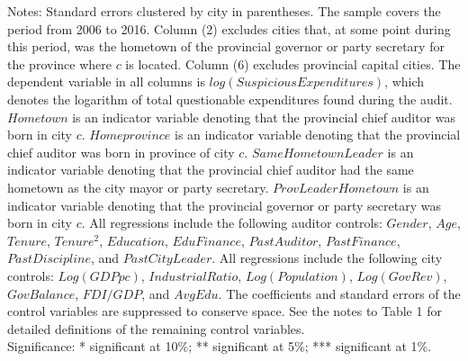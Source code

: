 \begin{table}[p]
\begin{threeparttable}
\begin{tablenotes}
\item Notes: Standard errors clustered by city in parentheses. The sample covers the period from 2006 to 2016. Column (2) excludes cities that, at some point during this period, was the hometown of the provincial governor or party secretary for the province where $ c $ is located. Column (6) excludes provincial capital cities. The dependent variable in all columns is $ log(SuspiciousExpenditures) $, which denotes the logarithm of total questionable expenditures found during the audit. $ Hometown $ is an indicator variable denoting that the provincial chief auditor was born in city $ c $. $ Homeprovince $ is an indicator variable denoting that the provincial chief auditor was born in province of city $ c $. $ Same Hometown Leader $ is an indicator variable denoting that the provincial chief auditor had the same hometown as the city mayor or party secretary. $ ProvLeaderHometown $ is an indicator variable denoting that the provincial governor or party secretary was born in city $ c $. All regressions include the following auditor controls: $ Gender $, $ Age $, $ Tenure $, $ Tenure^2 $, $ Education $, $ EduFinance $, $ PastAuditor $, $ PastFinance $, $ PastDiscipline $, and $ PastCityLeader $. All regressions include the following city controls: $ Log(GDP pc) $, $ IndustrialRatio $, $ Log(Population) $, $ Log(GovRev) $, $ GovBalance $, $ FDI/GDP $, and $ AvgEdu $. The coefficients and standard errors of the control variables are suppressed to conserve space. See the notes to Table 1 for detailed definitions of the remaining control variables.   \\  Significance: * significant at 10\%; ** significant at 5\%; *** significant at 1\%.
\end{tablenotes}
\end{threeparttable}\end{table}
